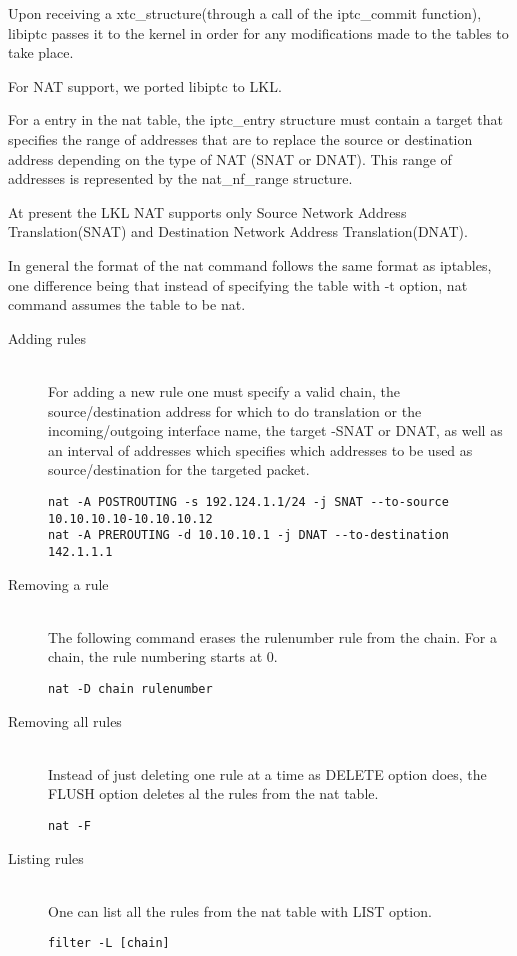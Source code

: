 {{\lstset{language=C, caption=TC_INIT}


Upon receiving a xtc_structure(through a call of the iptc_commit function), libiptc passes it to the kernel in order for any modifications made to the tables to take place.

For NAT support, we ported libiptc to LKL.

For a entry in the nat table, the iptc_entry structure must contain a target that specifies the range of addresses that are to replace the source or destination address depending on the type of NAT (SNAT or DNAT). This range of addresses is represented by the nat_nf_range structure.

\lstset{language=C, caption=struct nat_nf_range}


At present the LKL NAT supports only  Source Network Address Translation(SNAT) and  Destination Network Address Translation(DNAT).

In general the format of the nat command follows the same format as iptables, one difference being that instead of specifying the table with -t option, nat command assumes the table to be nat. 
\begin{description}
\item [Adding rules] \hfill \\
For adding a new rule one must specify a valid chain, the source/destination address for which to do translation or the incoming/outgoing interface name, the target -SNAT or DNAT, as well as an interval of addresses which specifies which addresses to be used as source/destination for the targeted packet.
\lstset{language=zsh,caption=Adding a rule,label=lst:saddrule}
\begin{lstlisting}
nat -A POSTROUTING -s 192.124.1.1/24 -j SNAT --to-source 10.10.10.10-10.10.10.12
nat -A PREROUTING -d 10.10.10.1 -j DNAT --to-destination 142.1.1.1
\end{lstlisting}
\item[Removing a rule] \hfill \\
The following command erases the rulenumber rule from the chain. For a chain, the rule numbering starts at 0.
\lstset{language=zsh,caption=Deleting a rule,label=lst:sdelrule}
\begin{lstlisting}
nat -D chain rulenumber
\end{lstlisting}
\item[Removing all rules] \hfill \\
Instead of just deleting one rule at a time as DELETE option does, the FLUSH option deletes al the rules from the nat table.
\lstset{language=zsh,caption=Deleting all rules,label=lst:sdelallrules}
\begin{lstlisting}
nat -F
\end{lstlisting}
\item [Listing rules] \hfill \\
One can list all the rules from the nat table with LIST option.
\lstset{language=zsh,caption=List rules,label=lst:slstrule}
\begin{lstlisting}
filter -L [chain]
\end{lstlisting}
\end{description}

}}

